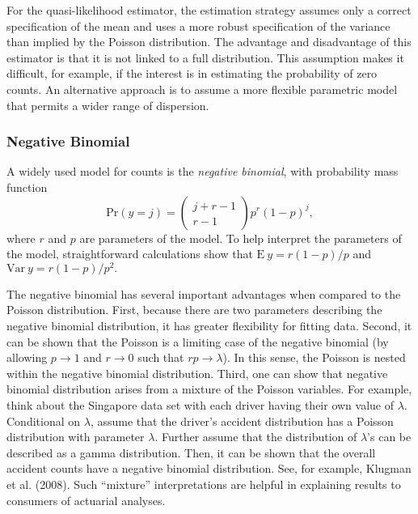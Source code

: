 {For the quasi-likelihood estimator, the estimation strategy assumes only a
correct specification of the mean and uses a more robust specification of
the variance than implied by the Poisson distribution. The advantage and
disadvantage of this estimator is that it is not linked to a full
distribution. This assumption makes it difficult, for example, if the
interest is in estimating the probability of zero counts. An alternative
approach is to assume a more flexible parametric model that permits a wider
range of dispersion.

\subsubsection*{Negative Binomial}

A widely used model for counts is the \emph{negative binomial}, with
probability mass function
\begin{equation}
\mathrm{Pr}(y=j)=\left(
\begin{array}{c}
j+r-1 \\
r-1
\end{array}
\right) p^{r}\left( 1-p\right)^j,
\end{equation}
where $r$ and $p$ are parameters of the model. To help interpret the
parameters of the model, straightforward calculations show that
$\mathrm{E~}y=r(1-p)/p$ and $\mathrm{Var~}y = r(1-p)/p^2.$

The negative binomial has several important advantages when compared
to the Poisson distribution. First, because there are two parameters
describing the negative binomial distribution, it has greater
flexibility for fitting data. Second, it can be shown that the
Poisson is a limiting case of the negative binomial (by allowing
$p\rightarrow 1$ and $r \rightarrow 0$ such that $rp \rightarrow
\lambda $). In this sense, the Poisson is nested within the negative
binomial distribution. Third, one can show that negative binomial
distribution arises from a mixture of the Poisson variables. For
example, think about the Singapore data set with each driver having
their own value of $\lambda $. Conditional on $\lambda $, assume
that the driver's accident distribution has a Poisson distribution
with parameter $\lambda $. Further assume that the distribution of
$\lambda $'s can be described as a gamma distribution. Then, it can
be shown that the overall accident counts have a negative binomial
distribution. See, for example, Klugman et al. (2008). Such
``mixture'' interpretations are helpful in explaining results to
consumers of actuarial analyses.

}
